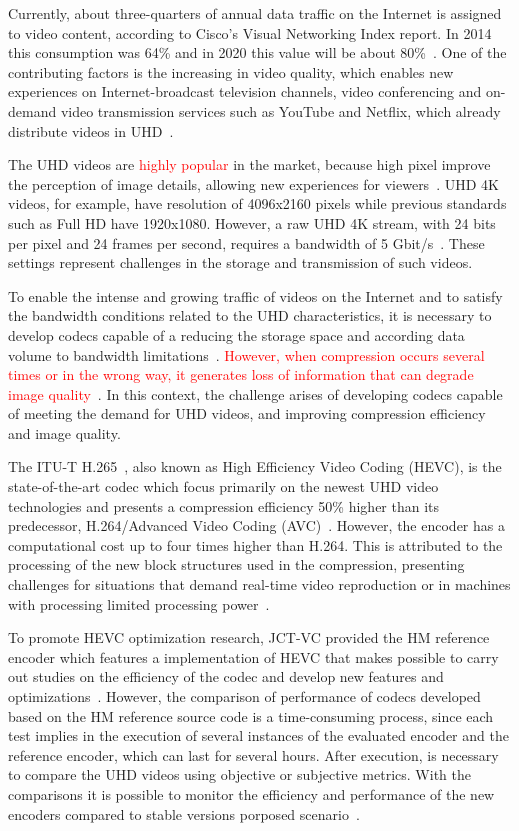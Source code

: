 \documentclass[journal]{IEEEtran}
\begin{document}
Currently, about three-quarters of annual data traffic on the Internet is assigned to video content, according to Cisco's Visual Networking Index report. In 2014 this consumption was 64\% and in 2020 this value will be about 80\%~\cite{Cisco:16}. One of the contributing factors is the increasing in video quality, which enables new experiences on Internet-broadcast television channels, video conferencing and on-demand video transmission services such as YouTube and Netflix, which already distribute videos in UHD~\cite{cheon:14}.


The UHD videos are \textcolor{red}{highly popular} in the market, because high pixel improve the perception of image details, allowing new experiences for viewers~\cite{cheon:14}. UHD 4K videos, for example, have resolution of 4096x2160 pixels while previous standards such as Full HD have 1920x1080. However, a raw UHD 4K stream, with 24 bits per pixel and 24 frames per second, requires a bandwidth of 5 Gbit/s~\cite{gomes:13}. These settings represent challenges in the storage and transmission of such videos.

To enable the intense and growing traffic of videos on the Internet and to satisfy the bandwidth conditions related to the UHD characteristics, it is necessary to develop codecs capable of a reducing the storage space and according data volume to bandwidth limitations~\cite{oliveira:16}\cite{wang:13}.  \textcolor{red}{However, when compression occurs several times or in the wrong way, it generates loss of information that can degrade image quality~\cite{netflix:16}}. In this context, the challenge arises of developing codecs capable of meeting the demand for UHD videos, and improving compression efficiency and image quality.

The ITU-T H.265~\cite{itu:265}, also known as High Efficiency Video Coding (HEVC), is the state-of-the-art codec which focus primarily on the newest UHD video technologies and presents a compression efficiency 50\% higher than its predecessor, H.264/Advanced Video Coding (AVC)~\cite{Bossen:12}\cite{Hanhart:12}\cite{Sullivan:12}. However, the encoder has a computational cost up to four times higher than H.264. This is attributed to the processing of the new block structures used in the compression, presenting challenges for situations that demand real-time video reproduction or in machines with processing limited processing power~\cite{Yoon:13}\cite{Correa:12}.


To promote HEVC optimization research, JCT-VC provided the HM reference encoder which features a implementation of HEVC that makes possible  to carry out studies on the efficiency of the codec and develop new features and optimizations~\cite{itu:10}. However, the comparison of performance of codecs developed based on the HM reference source code is a time-consuming process, since each test implies in the execution of several instances of the evaluated encoder and the reference encoder, which can last for several hours. After execution, is necessary to compare the UHD videos using objective or subjective metrics. With the comparisons it is possible to monitor the efficiency and performance of the new encoders compared to stable versions porposed scenario~\cite{netflix:16}.
\end{document}
